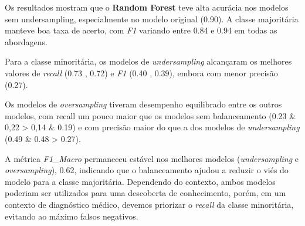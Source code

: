 \documentclass{article}
\begin{document}
\vspace{0.5cm}

Os resultados mostram que o \textbf{Random Forest} teve alta acurácia nos modelos sem undersampling, especialmente no modelo original (0.90). A classe majoritária manteve boa taxa de acerto, com \textit{F1} variando entre 0.84 e 0.94 em todas as abordagens.

Para a classe minoritária, os modelos de \textit{undersampling} alcançaram os melhores valores de \textit{recall} (0.73 ,  0.72) e \textit{F1} (0.40 , 0.39), embora com menor precisão (0.27).

Os modelos de \textit{oversampling} tiveram desempenho equilibrado entre os outros modelos, com recall um pouco maior que os modelos sem balanceamento (0.23 \& 0{,22} > 0{,14} \& 0.19) e com precisão maior do que a dos modelos de \textit{undersampling} (0.49 \& 0.48 > 0.27).

A métrica \textit{F1\_Macro} permaneceu estável nos melhores modelos (\textit{undersampling} e \textit{oversampling}), 0.62, indicando que o balanceamento ajudou a reduzir o viés do modelo para a classe majoritária. Dependendo do contexto, ambos modelos poderiam ser utilizados para uma descoberta de conhecimento, porém, em um contexto de diagnóstico médico, devemos priorizar o \textit{recall} da classe minoritária, evitando ao máximo falsos negativos.
\end{document}
